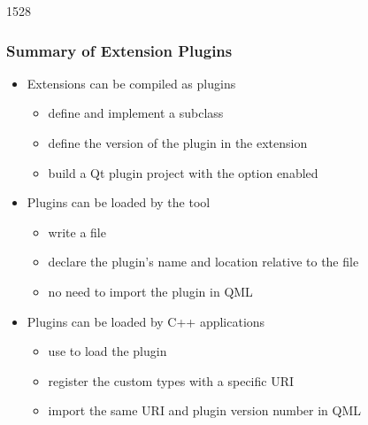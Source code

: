 \begin{slide}[fragile]{1528}\frametitle{Summary of Extension Plugins}

\begin{itemize}
\item Extensions can be compiled as plugins
  \begin{itemize}
  \item define and implement a  subclass
  \item define the version of the plugin in the extension
  \item build a Qt plugin project with the  option enabled
  \end{itemize}
\vspace*{0.5em}
\item Plugins can be loaded by the  tool
  \begin{itemize}
  \item write a  file
  \item declare the plugin's name and location relative to the file
  \item no need to import the plugin in QML
  \end{itemize}
\vspace*{0.5em}
\item Plugins can be loaded by C++ applications
  \begin{itemize}
  \item use  to load the plugin
  \item register the custom types with a specific URI
  \item import the same URI and plugin version number in QML
  \end{itemize}
\end{itemize}

\end{slide}
